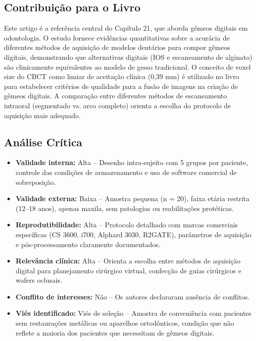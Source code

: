\subsection{Contribuição para o Livro}
Este artigo é a referência central do Capítulo 21, que aborda gêmeos digitais
em odontologia. O estudo fornece evidências quantitativas sobre a acurácia de
diferentes métodos de aquisição de modelos dentários para compor gêmeos
digitais, demonstrando que alternativas digitais (IOS e escaneamento de
alginato) são clinicamente equivalentes ao modelo de gesso tradicional.
O conceito de voxel size do CBCT como limiar de aceitação clínica (0,39 mm)
é utilizado no livro para estabelecer critérios de qualidade para a fusão de
imagens na criação de gêmeos digitais. A comparação entre diferentes métodos
de escaneamento intraoral (segmentado vs. arco completo) orienta a escolha do
protocolo de aquisição mais adequado.

\subsection{Análise Crítica}
\begin{itemize}
  \item \textbf{Validade interna:} Alta -- Desenho intra-sujeito com 5 grupos
        por paciente, controle das condições de armazenamento e uso de
        software comercial de sobreposição.
  \item \textbf{Validade externa:} Baixa -- Amostra pequena (n = 20), faixa
        etária restrita (12--18 anos), apenas maxila, sem patologias ou
        reabilitações protéticas.
  \item \textbf{Reprodutibilidade:} Alta -- Protocolo detalhado com marcas
        comerciais específicas (CS 3600, i700, Alphard 3030, R2GATE),
        parâmetros de aquisição e pós-processamento claramente documentados.
  \item \textbf{Relevância clínica:} Alta -- Orienta a escolha entre métodos
        de aquisição digital para planejamento cirúrgico virtual, confecção
        de guias cirúrgicos e wafers oclusais.
  \item \textbf{Conflito de interesses:} Não -- Os autores declararam ausência de
        conflitos.
  \item \textbf{Viés identificado:} Viés de seleção -- Amostra de conveniência
        com pacientes sem restaurações metálicas ou aparelhos ortodônticos,
        condição que não reflete a maioria dos pacientes que necessitam de
        gêmeos digitais.
\end{itemize}

